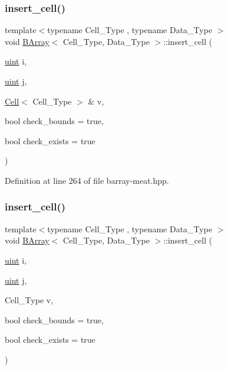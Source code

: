 \subsubsection{\texorpdfstring{insert\+\_\+cell()}{insert\_cell()}\hspace{0.1cm}{\footnotesize\ttfamily [1/10]}}
{\footnotesize\ttfamily template$<$typename Cell\+\_\+\+Type , typename Data\+\_\+\+Type $>$ \\
void \hyperlink{class_b_array}{B\+Array}$<$ Cell\+\_\+\+Type, Data\+\_\+\+Type $>$\+::insert\+\_\+cell (\begin{DoxyParamCaption}\item[{\hyperlink{typedefs_8hpp_a91ad9478d81a7aaf2593e8d9c3d06a14}{uint}}]{i,  }\item[{\hyperlink{typedefs_8hpp_a91ad9478d81a7aaf2593e8d9c3d06a14}{uint}}]{j,  }\item[{\hyperlink{class_cell}{Cell}$<$ Cell\+\_\+\+Type $>$ \&}]{v,  }\item[{bool}]{check\+\_\+bounds = {\ttfamily true},  }\item[{bool}]{check\+\_\+exists = {\ttfamily true} }\end{DoxyParamCaption})\hspace{0.3cm}{\ttfamily [inline]}}



Definition at line 264 of file barray-\/meat.\+hpp.

\mbox{\label{class_b_array_aa7268761d977833b688123d161d17d1b}} 
\subsubsection{\texorpdfstring{insert\+\_\+cell()}{insert\_cell()}\hspace{0.1cm}{\footnotesize\ttfamily [2/10]}}
{\footnotesize\ttfamily template$<$typename Cell\+\_\+\+Type , typename Data\+\_\+\+Type $>$ \\
void \hyperlink{class_b_array}{B\+Array}$<$ Cell\+\_\+\+Type, Data\+\_\+\+Type $>$\+::insert\+\_\+cell (\begin{DoxyParamCaption}\item[{\hyperlink{typedefs_8hpp_a91ad9478d81a7aaf2593e8d9c3d06a14}{uint}}]{i,  }\item[{\hyperlink{typedefs_8hpp_a91ad9478d81a7aaf2593e8d9c3d06a14}{uint}}]{j,  }\item[{Cell\+\_\+\+Type}]{v,  }\item[{bool}]{check\+\_\+bounds = {\ttfamily true},  }\item[{bool}]{check\+\_\+exists = {\ttfamily true} }\end{DoxyParamCaption})\hspace{0.3cm}{\ttfamily [inline]}}



